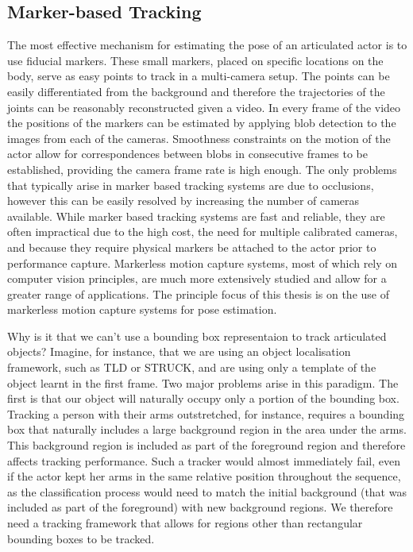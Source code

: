 \subsection{Marker-based Tracking}
The most effective mechanism for estimating the pose of an articulated actor is to use fiducial markers. These small markers, placed on specific locations on the body, serve as easy points to track in a multi-camera setup. The points can be easily differentiated from the background and therefore the trajectories of the joints can be reasonably reconstructed given a video. In every frame of the video the positions of the markers can be estimated by applying blob detection to the images from each of the cameras. Smoothness constraints on the motion of the actor allow for correspondences between blobs in consecutive frames to be established, providing the camera frame rate is high enough. The only problems that typically arise in marker based tracking systems are due to occlusions, however this can be easily resolved by increasing the number of cameras available. While marker based tracking systems are fast and reliable, they are often impractical due to the high cost, the need for multiple calibrated cameras, and because they require physical markers be attached to the actor prior to performance capture. Markerless motion capture systems, most of which rely on computer vision principles, are much more extensively studied and allow for a greater range of applications. The principle focus of this thesis is on the use of markerless motion capture systems for pose estimation. 

Why is it that we can't use a bounding box representaion to track articulated objects? Imagine, for instance, that we are using an object localisation framework, such as TLD or STRUCK, and are using only a template of the object learnt in the first frame. Two major problems arise in this paradigm. The first is that our object will naturally occupy only a portion of the bounding box. Tracking a person with their arms outstretched, for instance, requires a bounding box that naturally includes a large background region in the area under the arms. This background region is included as part of the foreground region and therefore affects tracking performance. Such a tracker would almost immediately fail, even if the actor kept her arms in the same relative position throughout the sequence, as the classification process would need to match the initial background (that was included as part of the foreground) with new background regions. We therefore need a tracking framework that allows for regions other than rectangular bounding boxes to be tracked. 


